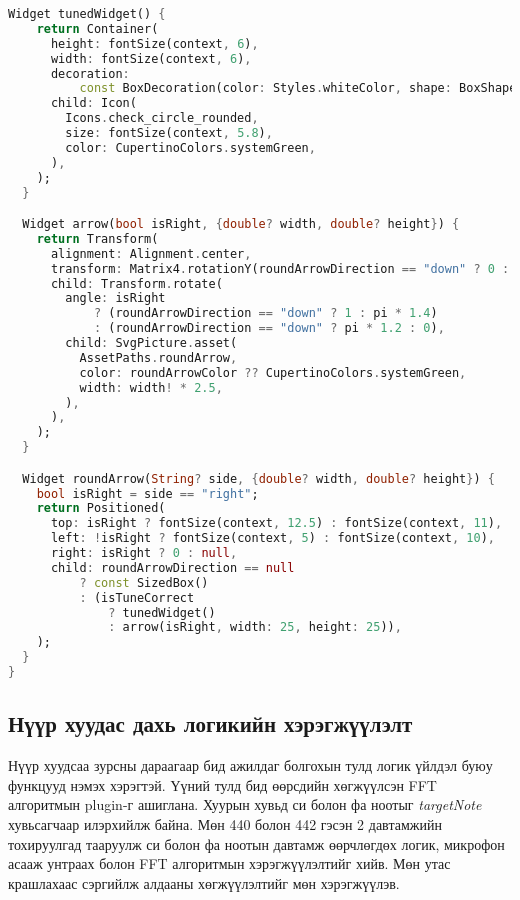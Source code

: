 \begin{lstlisting}[language=Dart, caption=Нүүр хуудсын зуралт ба хэрэгжүүлэлт, frame=single]
  Widget tunedWidget() {
    return Container(
      height: fontSize(context, 6),
      width: fontSize(context, 6),
      decoration:
          const BoxDecoration(color: Styles.whiteColor, shape: BoxShape.circle),
      child: Icon(
        Icons.check_circle_rounded,
        size: fontSize(context, 5.8),
        color: CupertinoColors.systemGreen,
      ),
    );
  }

  Widget arrow(bool isRight, {double? width, double? height}) {
    return Transform(
      alignment: Alignment.center,
      transform: Matrix4.rotationY(roundArrowDirection == "down" ? 0 : pi),
      child: Transform.rotate(
        angle: isRight
            ? (roundArrowDirection == "down" ? 1 : pi * 1.4)
            : (roundArrowDirection == "down" ? pi * 1.2 : 0),
        child: SvgPicture.asset(
          AssetPaths.roundArrow,
          color: roundArrowColor ?? CupertinoColors.systemGreen,
          width: width! * 2.5,
        ),
      ),
    );
  }

  Widget roundArrow(String? side, {double? width, double? height}) {
    bool isRight = side == "right";
    return Positioned(
      top: isRight ? fontSize(context, 12.5) : fontSize(context, 11),
      left: !isRight ? fontSize(context, 5) : fontSize(context, 10),
      right: isRight ? 0 : null,
      child: roundArrowDirection == null
          ? const SizedBox()
          : (isTuneCorrect
              ? tunedWidget()
              : arrow(isRight, width: 25, height: 25)),
    );
  }
}

\end{lstlisting}
\pagebreak

\subsection{Нүүр хуудас дахь логикийн хэрэгжүүлэлт}

Нүүр хуудсаа зурсны дараагаар бид ажилдаг болгохын тулд логик үйлдэл буюу функцууд нэмэх хэрэгтэй. Үүний тулд бид өөрсдийн хөгжүүлсэн FFT алгоритмын plugin-г ашиглана. Хуурын хувьд си болон фа ноотыг \emph{targetNote} хувьсагчаар илэрхийлж байна. Мөн 440 болон 442 гэсэн 2 давтамжийн тохируулгад тааруулж си болон фа ноотын давтамж өөрчлөгдөх логик, микрофон асааж унтраах болон FFT алгоритмын хэрэгжүүлэлтийг хийв. Мөн утас крашлахаас сэргийлж алдааны хөгжүүлэлтийг мөн хэрэгжүүлэв.

